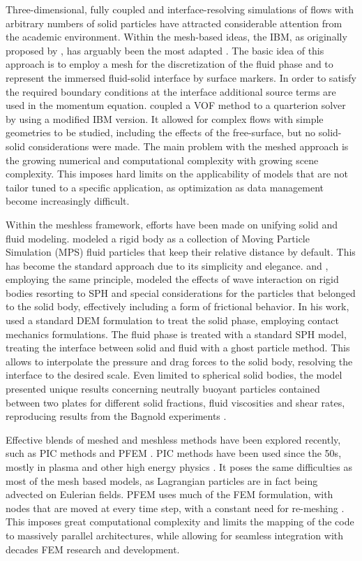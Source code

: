 Three-dimensional, fully coupled and interface-resolving simulations of flows with arbitrary numbers of solid particles have attracted considerable attention from the academic environment. Within the mesh-based ideas, the \ac{IBM}, as originally proposed by \cite{Peskin-1977}, has arguably been the most adapted \citep{Prosperetti-2007}. The basic idea of this approach is to employ a mesh for the discretization of the fluid phase and to represent the immersed fluid-solid interface by surface markers. In order to satisfy the required boundary conditions at the interface additional source terms are used in the momentum equation. \cite{Fekken-2004} coupled a \ac{VOF} method to a quarterion solver by using a modified \ac{IBM} version. It allowed for complex flows with simple geometries to be studied, including the effects of the free-surface, but no solid-solid considerations were made. The main problem with the meshed approach is the growing numerical and computational complexity with growing scene complexity. This imposes hard limits on the applicability of models that are not tailor tuned to a specific application, as optimization as data management become increasingly difficult.

Within the meshless framework, efforts have been made on unifying solid and fluid modeling. \cite{Koshizuka-1998} modeled a rigid body as a collection of Moving Particle Simulation (MPS) fluid particles that keep their relative distance by default. This has become the standard approach due to its simplicity and elegance. \cite{Monaghan-2003} and \cite{Rogers-2010}, employing the same principle, modeled the effects of wave interaction on rigid bodies resorting to \ac{SPH} and special considerations for the particles that belonged to the solid body, effectively including a form of frictional behavior. In his work, \cite{Potapov-2001} used a standard \ac{DEM} formulation to treat the solid phase, employing contact mechanics formulations. The fluid phase is treated with a standard \ac{SPH} model, treating the interface between solid and fluid with a ghost particle method. This allows to interpolate the pressure and drag forces to the solid body, resolving the interface to the desired scale. Even limited to spherical solid bodies, the model presented unique results concerning neutrally buoyant particles contained between two plates for different solid fractions, fluid viscosities and shear rates, reproducing results from the Bagnold experiments \citep{bagnold-1954}. 

Effective blends of meshed and meshless methods have been explored recently, such as \ac{PIC} methods and \ac{PFEM} \citep{Liu-2003}. \ac{PIC} methods have been used since the 50s, mostly in plasma and other high energy physics \citep{Evans-1957}. It poses the same difficulties as most of the mesh based models, as Lagrangian particles are in fact being advected on Eulerian fields. \ac{PFEM} uses much of the \ac{FEM} formulation, with nodes that are moved at every time step, with a constant need for re-meshing \citep{Onate-al-2004, Idelsohn-al-2004}. This imposes great computational complexity and limits the mapping of the code to massively parallel architectures, while allowing for seamless integration with decades \ac{FEM} research and development.
